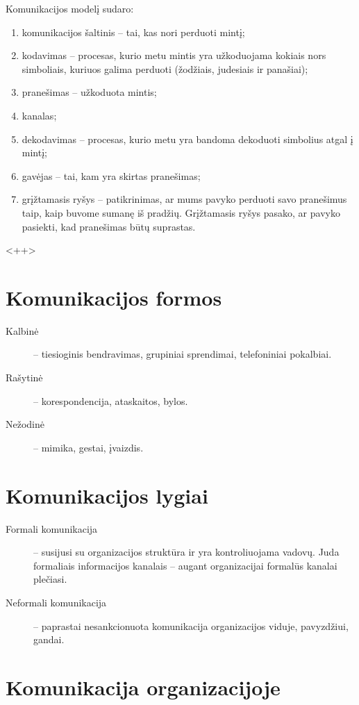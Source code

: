 Komunikacijos modelį sudaro:
\begin{enumerate}
  \item komunikacijos šaltinis – tai, kas nori perduoti mintį;
  \item kodavimas – procesas, kurio metu mintis yra užkoduojama
    kokiais nors simboliais, kuriuos galima perduoti (žodžiais,
    judesiais ir panašiai);
  \item pranešimas – užkoduota mintis;
  \item kanalas;
  \item dekodavimas – procesas, kurio metu yra bandoma dekoduoti
    simbolius atgal į mintį;
  \item gavėjas – tai, kam yra skirtas pranešimas;
  \item grįžtamasis ryšys – patikrinimas, ar mums pavyko perduoti
    savo pranešimus taip, kaip buvome sumanę iš pradžių. Grįžtamasis
    ryšys pasako, ar pavyko pasiekti, kad pranešimas būtų suprastas.
\end{enumerate}<++>

\section{Komunikacijos formos}

\begin{description}
  \item[Kalbinė] – tiesioginis bendravimas, grupiniai sprendimai,
    telefoniniai pokalbiai.
  \item[Rašytinė] – korespondencija, ataskaitos, bylos.
  \item[Nežodinė] – mimika, gestai, įvaizdis.
\end{description}

\section{Komunikacijos lygiai}

\begin{description}
  \item[Formali komunikacija] – susijusi su organizacijos struktūra ir
    yra kontroliuojama vadovų. Juda formaliais informacijos kanalais
    – augant organizacijai formalūs kanalai plečiasi.
  \item[Neformali komunikacija] – paprastai nesankcionuota komunikacija
    organizacijos viduje, pavyzdžiui, gandai.
\end{description}

\section{Komunikacija organizacijoje}

